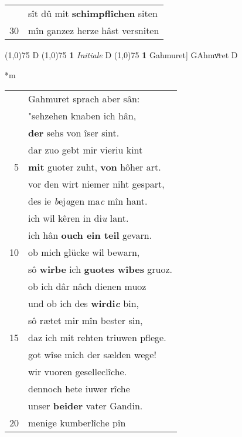 \documentclass[8pt,a4paper,notitlepage]{article}
\begin{document}
\begin{table}[ht]
\begin{minipage}[t]{0.5\linewidth}
\begin{tabular}{rl}
 & sît dû mit \textbf{schimpflîchen} siten\\ 
30 & mîn ganzez herze hâst versniten\\ 
\end{tabular}
\scriptsize
\line(1,0){75} \newline
D \newline
\line(1,0){75} \newline
\textbf{1} \textit{Initiale} D  \newline
\line(1,0){75} \newline
\textbf{1} Gahmuret] GAhmvͦret D \newline
\end{minipage}
\hspace{0.5cm}
\begin{minipage}[t]{0.5\linewidth}
\small
\begin{center}*m
\end{center}
\begin{tabular}{rl}
 & Gahmuret sprach aber sân:\\ 
 & "sehzehen knaben ich hân,\\ 
 & \textbf{der} sehs von îser sint.\\ 
 & dar zuo gebt mir vieriu kint\\ 
5 & \textbf{mit} guoter zuht, \textbf{von} hôher art.\\ 
 & vor den wirt niemer niht gespart,\\ 
 & des ie \textit{b}ej\textit{a}gen ma\textit{c} mîn hant.\\ 
 & ich wil kêren in di\textit{u} lant.\\ 
 & ich hân \textbf{ouch ein teil} gevarn.\\ 
10 & ob mich glücke wil bewarn,\\ 
 & sô \textbf{wirbe} ich \textbf{guotes wîbes} gruoz.\\ 
 & ob ich dâr nâch dienen muoz\\ 
 & und ob ich des \textbf{wirdi\textit{c}} bin,\\ 
 & sô rætet mir mîn bester sin,\\ 
15 & daz ich mit rehten triuwen pflege.\\ 
 & got wîse mich der sælden wege!\\ 
 & wir vuoren geselleclîche.\\ 
 & dennoch hete iuwer rîche\\ 
 & unser \textbf{beider} vater Gandin.\\ 
20 & menige kumberlîche pîn\\ 

\end{tabular}
\end{minipage}
\end{table}
\end{document}
